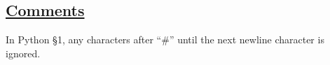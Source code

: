 \subsection*{\href{https://sourceacademy.org/sicpjs/2.2.3\#footnote-8}{Comments}}

In Python \S 1, any characters after ``\#'' until the next newline character is ignored.
